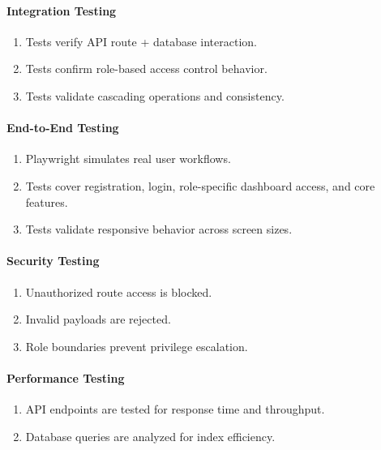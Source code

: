 \documentclass[11pt,a4paper]{article}
\begin{document}
\paragraph{Integration Testing}

\begin{enumerate}
    \item Tests verify API route + database interaction.
    \item Tests confirm role-based access control behavior.
    \item Tests validate cascading operations and consistency.
\end{enumerate}

\paragraph{End-to-End Testing}

\begin{enumerate}
    \item Playwright simulates real user workflows.
    \item Tests cover registration, login, role-specific dashboard access, and core features.
    \item Tests validate responsive behavior across screen sizes.
\end{enumerate}

\paragraph{Security Testing}

\begin{enumerate}
    \item Unauthorized route access is blocked.
    \item Invalid payloads are rejected.
    \item Role boundaries prevent privilege escalation.
\end{enumerate}

\paragraph{Performance Testing}

\begin{enumerate}
    \item API endpoints are tested for response time and throughput.
    \item Database queries are analyzed for index efficiency.
\end{enumerate}
\end{document}
